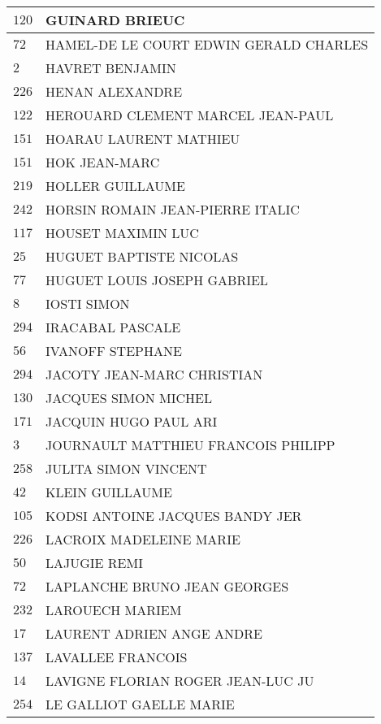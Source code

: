 \begin{xltabular}{\linewidth}{|l|X|}
    \hline
    $120$ & GUINARD BRIEUC \\
    \hline
    $72$ & HAMEL-DE LE COURT EDWIN GERALD CHARLES \\
    \hline
    $2$ & HAVRET BENJAMIN \\
    \hline
    $226$ & HENAN ALEXANDRE \\
    \hline
    $122$ & HEROUARD CLEMENT MARCEL JEAN-PAUL \\
    \hline
    $151$ & HOARAU LAURENT MATHIEU \\
    \hline
    $151$ & HOK JEAN-MARC \\
    \hline
    $219$ & HOLLER GUILLAUME \\
    \hline
    $242$ & HORSIN ROMAIN JEAN-PIERRE ITALIC \\
    \hline
    $117$ & HOUSET MAXIMIN LUC \\
    \hline
    $25$ & HUGUET BAPTISTE NICOLAS \\
    \hline
    $77$ & HUGUET LOUIS JOSEPH GABRIEL \\
    \hline
    $8$ & IOSTI SIMON \\
    \hline
    $294$ & IRACABAL PASCALE \\
    \hline
    $56$ & IVANOFF STEPHANE \\
    \hline
    $294$ & JACOTY JEAN-MARC CHRISTIAN \\
    \hline
    $130$ & JACQUES SIMON MICHEL \\
    \hline
    $171$ & JACQUIN HUGO PAUL ARI \\
    \hline
    $3$ & JOURNAULT MATTHIEU FRANCOIS PHILIPP \\
    \hline
    $258$ & JULITA SIMON VINCENT \\
    \hline
    $42$ & KLEIN GUILLAUME \\
    \hline
    $105$ & KODSI ANTOINE JACQUES BANDY JER \\
    \hline
    $226$ & LACROIX MADELEINE MARIE \\
    \hline
    $50$ & LAJUGIE REMI \\
    \hline
    $72$ & LAPLANCHE BRUNO JEAN GEORGES \\
    \hline
    $232$ & LAROUECH MARIEM \\
    \hline
    $17$ & LAURENT ADRIEN ANGE ANDRE \\
    \hline
    $137$ & LAVALLEE FRANCOIS \\
    \hline
    $14$ & LAVIGNE FLORIAN ROGER JEAN-LUC JU \\
    \hline
    $254$ & LE GALLIOT GAELLE MARIE \\

\end{xltabular}
